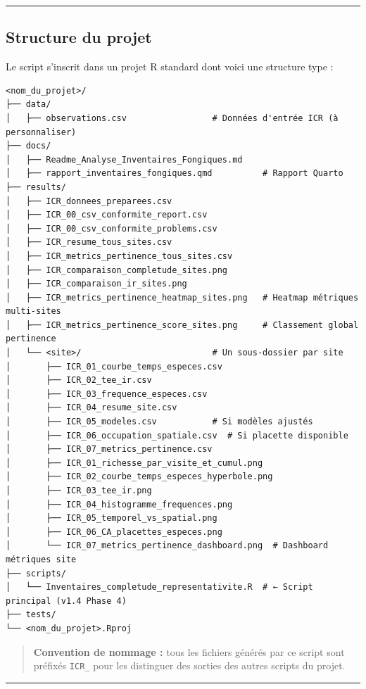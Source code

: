 \begin{center}\rule{0.5\linewidth}{0.5pt}\end{center}

\subsection{Structure du projet}\label{structure-du-projet}

Le script s'inscrit dans un projet R standard dont voici une structure
type :

\begin{verbatim}
<nom_du_projet>/
├── data/
│   ├── observations.csv                 # Données d'entrée ICR (à personnaliser)
├── docs/
│   ├── Readme_Analyse_Inventaires_Fongiques.md
│   ├── rapport_inventaires_fongiques.qmd          # Rapport Quarto
├── results/
│   ├── ICR_donnees_preparees.csv
│   ├── ICR_00_csv_conformite_report.csv
│   ├── ICR_00_csv_conformite_problems.csv
│   ├── ICR_resume_tous_sites.csv
│   ├── ICR_metrics_pertinence_tous_sites.csv
│   ├── ICR_comparaison_completude_sites.png
│   ├── ICR_comparaison_ir_sites.png
│   ├── ICR_metrics_pertinence_heatmap_sites.png   # Heatmap métriques multi-sites
│   ├── ICR_metrics_pertinence_score_sites.png     # Classement global pertinence
│   └── <site>/                          # Un sous-dossier par site
│       ├── ICR_01_courbe_temps_especes.csv
│       ├── ICR_02_tee_ir.csv
│       ├── ICR_03_frequence_especes.csv
│       ├── ICR_04_resume_site.csv
│       ├── ICR_05_modeles.csv           # Si modèles ajustés
│       ├── ICR_06_occupation_spatiale.csv  # Si placette disponible
│       ├── ICR_07_metrics_pertinence.csv
│       ├── ICR_01_richesse_par_visite_et_cumul.png
│       ├── ICR_02_courbe_temps_especes_hyperbole.png
│       ├── ICR_03_tee_ir.png
│       ├── ICR_04_histogramme_frequences.png
│       ├── ICR_05_temporel_vs_spatial.png
│       ├── ICR_06_CA_placettes_especes.png
│       └── ICR_07_metrics_pertinence_dashboard.png  # Dashboard métriques site
├── scripts/
│   └── Inventaires_completude_representativite.R  # ← Script principal (v1.4 Phase 4)
├── tests/
└── <nom_du_projet>.Rproj
\end{verbatim}

\begin{quote}
\textbf{Convention de nommage :} tous les fichiers générés par ce script
sont préfixés \texttt{ICR\_} pour les distinguer des sorties des autres
scripts du projet.
\end{quote}

\begin{center}\rule{0.5\linewidth}{0.5pt}\end{center}

